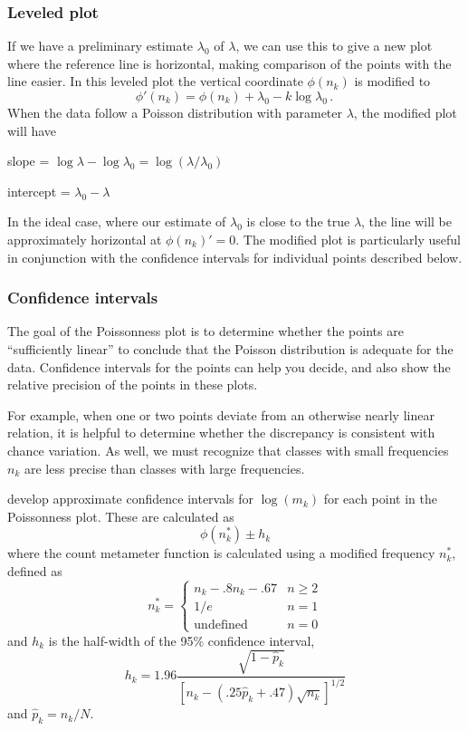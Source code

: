 \documentclass[10pt,krantz2]{krantz}\usepackage[]{graphicx}\usepackage[]{color}
\begin{document}
\subsubsection{Leveled plot}
If we have a preliminary estimate $\lambda_0$ of $\lambda$,
we can use this to give a new plot where the reference line
is horizontal, making comparison of the points with the line
easier.
In this leveled plot the vertical coordinate $\phi (n_k)$ is modified to
\begin{equation}\label{eq:pois-leveled}
 \phi ' (n_k) = \phi (n_k) + \lambda_0 - k \log \lambda_0
 \period
\end{equation}
When the data follow a Poisson distribution with parameter
$\lambda$, the modified plot will have
\begin{itemize*}
\item slope = \(\log  \lambda - \log  \lambda_0 = \log ( \lambda / \lambda_0 ) \)
\item intercept = \(\lambda_0 - \lambda\)
\end{itemize*}
In the ideal case, where our estimate of $\lambda_0$ is close to the true
$\lambda$, the line will be approximately
horizontal at $\phi(n_k) ' = 0$.
The modified plot is particularly useful in conjunction with the
confidence intervals for individual points described below.

\subsubsection{Confidence intervals}
The goal of the Poissonness plot is to determine whether the points
are ``sufficiently linear'' to conclude that the Poisson distribution
is adequate for the data. Confidence intervals for the points can help
you decide, and also show the relative precision of the points in these
plots.

For example, when one or two points deviate from an otherwise nearly linear
relation,
it is helpful to determine whether the discrepancy is consistent with
chance variation.
As well, we must recognize that classes with small frequencies $n_k$
are less precise than classes with large frequencies.

\citet{HoaglinTukey:85} develop approximate confidence intervals
for $\log (m_k)$ for each point in the Poissonness plot.
These are calculated as
\begin{equation}\label{eq:poisCI}
\phi \left( n_k^{*}\right) \pm h_k
\end{equation}
where the count metameter function is calculated using a modified frequency $%
n_k^{*}$, defined as
\begin{equation*}
n_k^{*}= \left\{
\begin{array}{ll}
n_k-.8n_k-.67 & n\geq 2 \\
1/e & n=1 \\
\textrm{undefined} & n=0
\end{array}
\right.
\end{equation*}
%
and $h_k$ is the half-width of the 95\% confidence interval,
\begin{equation*}
h_k=1.96\frac{\sqrt{1-\widehat{p}_k}}{[n_k-(.25\widehat{p}_k+.47)\sqrt{n_k}%
]^{1/2}}
\end{equation*}
and $\hat{p}_k = n_k / N$.
\end{document}
